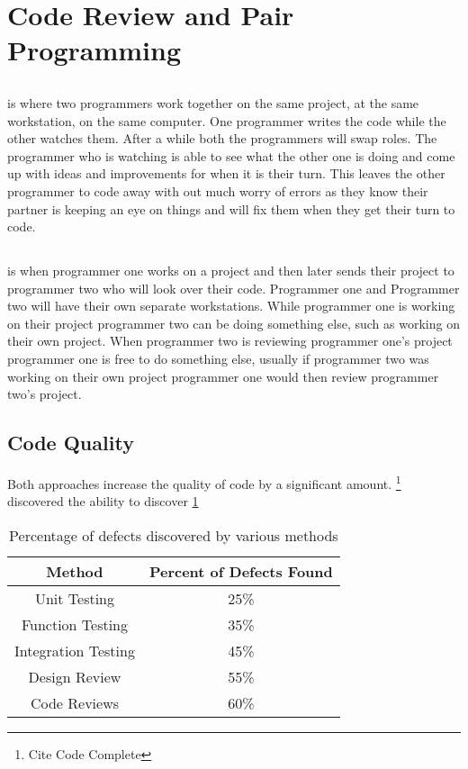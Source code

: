 \documentclass{article}
\begin{document}
\section{Code Review and Pair Programming}

\subsection{\PP}
\PP is where two programmers work together on the same project, at the same workstation, on the same computer. One programmer writes the code while the other watches them. After a while both the programmers will swap roles. The programmer who is watching is able to see what the other one is doing and come up with ideas and improvements for when it is their turn. This leaves the other programmer to code away with out much worry of errors as they know their partner is keeping an eye on things and will fix them when they get their turn to code.

\subsection{\CR}
\CR is when programmer one works on a project and then later sends their project to programmer two who will look over their code. Programmer one and Programmer two will have their own separate workstations. While programmer one is working on their project programmer two can be doing something else, such as working on their own project. When programmer two is reviewing programmer one's project programmer one is free to do something else, usually if programmer two was working on their own project programmer one would then review programmer two's project. 

\subsection{Code Quality}

Both approaches increase the quality of code by a significant amount. \footnote{Cite Code Complete} discovered the ability to discover \ref{tab:defect}

\begin{table}[hb]
\begin{tabular}{c|c}
Method & Percent of Defects Found\\\hline
Unit Testing & 25\% \\
Function Testing & 35\% \\
Integration Testing & 45\% \\
Design Review & 55\% \\
Code Reviews & 60\%\\
\end{tabular}
\label{tab:defect}
\caption{Percentage of defects discovered by various methods}
\end{table}
\end{document}
